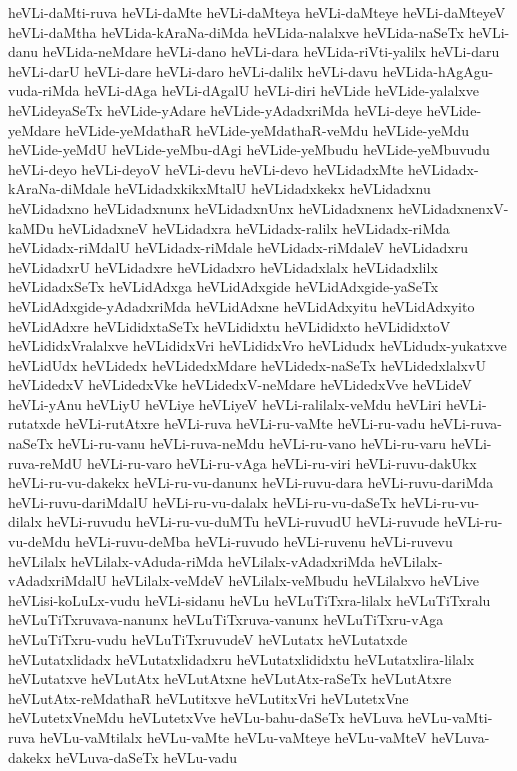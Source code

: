 {heVLi-daMti-ruva
heVLi-daMte
heVLi-daMteya
heVLi-daMteye
heVLi-daMteyeV
heVLi-daMtha
heVLida-kAraNa-diMda
heVLida-nalalxve
heVLida-naSeTx
heVLi-danu
heVLida-neMdare
heVLi-dano
heVLi-dara
heVLida-riVti-yalilx
heVLi-daru
heVLi-darU
heVLi-dare
heVLi-daro
heVLi-dalilx
heVLi-davu
heVLida-hAgAgu-vuda-riMda
heVLi-dAga
heVLi-dAgalU
heVLi-diri
heVLide
heVLide-yalalxve
heVLideyaSeTx
heVLide-yAdare
heVLide-yAdadxriMda
heVLi-deye
heVLide-yeMdare
heVLide-yeMdathaR
heVLide-yeMdathaR-veMdu
heVLide-yeMdu
heVLide-yeMdU
heVLide-yeMbu-dAgi
heVLide-yeMbudu
heVLide-yeMbuvudu
heVLi-deyo
heVLi-deyoV
heVLi-devu
heVLi-devo
heVLidadxMte
heVLidadx-kAraNa-diMdale
heVLidadxkikxMtalU
heVLidadxkekx
heVLidadxnu
heVLidadxno
heVLidadxnunx
heVLidadxnUnx
heVLidadxnenx
heVLidadxnenxV-kaMDu
heVLidadxneV
heVLidadxra
heVLidadx-ralilx
heVLidadx-riMda
heVLidadx-riMdalU
heVLidadx-riMdale
heVLidadx-riMdaleV
heVLidadxru
heVLidadxrU
heVLidadxre
heVLidadxro
heVLidadxlalx
heVLidadxlilx
heVLidadxSeTx
heVLidAdxga
heVLidAdxgide
heVLidAdxgide-yaSeTx
heVLidAdxgide-yAdadxriMda
heVLidAdxne
heVLidAdxyitu
heVLidAdxyito
heVLidAdxre
heVLididxtaSeTx
heVLididxtu
heVLididxto
heVLididxtoV
heVLididxVralalxve
heVLididxVri
heVLididxVro
heVLidudx
heVLidudx-yukatxve
heVLidUdx
heVLidedx
heVLidedxMdare
heVLidedx-naSeTx
heVLidedxlalxvU
heVLidedxV
heVLidedxVke
heVLidedxV-neMdare
heVLidedxVve
heVLideV
heVLi-yAnu
heVLiyU
heVLiye
heVLiyeV
heVLi-ralilalx-veMdu
heVLiri
heVLi-rutatxde
heVLi-rutAtxre
heVLi-ruva
heVLi-ru-vaMte
heVLi-ru-vadu
heVLi-ruva-naSeTx
heVLi-ru-vanu
heVLi-ruva-neMdu
heVLi-ru-vano
heVLi-ru-varu
heVLi-ruva-reMdU
heVLi-ru-varo
heVLi-ru-vAga
heVLi-ru-viri
heVLi-ruvu-dakUkx
heVLi-ru-vu-dakekx
heVLi-ru-vu-danunx
heVLi-ruvu-dara
heVLi-ruvu-dariMda
heVLi-ruvu-dariMdalU
heVLi-ru-vu-dalalx
heVLi-ru-vu-daSeTx
heVLi-ru-vu-dilalx
heVLi-ruvudu
heVLi-ru-vu-duMTu
heVLi-ruvudU
heVLi-ruvude
heVLi-ru-vu-deMdu
heVLi-ruvu-deMba
heVLi-ruvudo
heVLi-ruvenu
heVLi-ruvevu
heVLilalx
heVLilalx-vAduda-riMda
heVLilalx-vAdadxriMda
heVLilalx-vAdadxriMdalU
heVLilalx-veMdeV
heVLilalx-veMbudu
heVLilalxvo
heVLive
heVLisi-koLuLx-vudu
heVLi-sidanu
heVLu
heVLuTiTxra-lilalx
heVLuTiTxralu
heVLuTiTxruvava-nanunx
heVLuTiTxruva-vanunx
heVLuTiTxru-vAga
heVLuTiTxru-vudu
heVLuTiTxruvudeV
heVLutatx
heVLutatxde
heVLutatxlidadx
heVLutatxlidadxru
heVLutatxlididxtu
heVLutatxlira-lilalx
heVLutatxve
heVLutAtx
heVLutAtxne
heVLutAtx-raSeTx
heVLutAtxre
heVLutAtx-reMdathaR
heVLutitxve
heVLutitxVri
heVLutetxVne
heVLutetxVneMdu
heVLutetxVve
heVLu-bahu-daSeTx
heVLuva
heVLu-vaMti-ruva
heVLu-vaMtilalx
heVLu-vaMte
heVLu-vaMteye
heVLu-vaMteV
heVLuva-dakekx
heVLuva-daSeTx
heVLu-vadu
}
